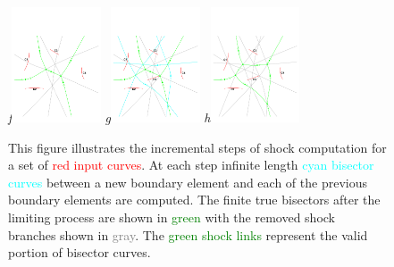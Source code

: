 \begin{figure}[ht]
{\footnotesize\textit{f}}\includegraphics[width=0.235\textwidth]{figs/incremental-voro-04-02.pdf}
{\footnotesize\textit{g}}\includegraphics[width=0.235\textwidth]{figs/incremental-voro-05-01.pdf}
{\footnotesize\textit{h}}\includegraphics[width=0.235\textwidth]{figs/incremental-voro-05-02.pdf}

\caption{This figure illustrates the incremental steps of shock computation for a set of \textcolor{red}{red input curves}. At each step infinite length \textcolor{cyan}{cyan bisector curves} between a new boundary element and each of the previous boundary elements are computed. The finite true bisectors after the limiting process are shown in \textcolor{green}{green} with the removed shock branches shown in \textcolor{gray}{gray}. The \textcolor{green}{green shock links} represent the valid portion of bisector curves.} 
\label{fig:sc2_steps}
\end{figure}


